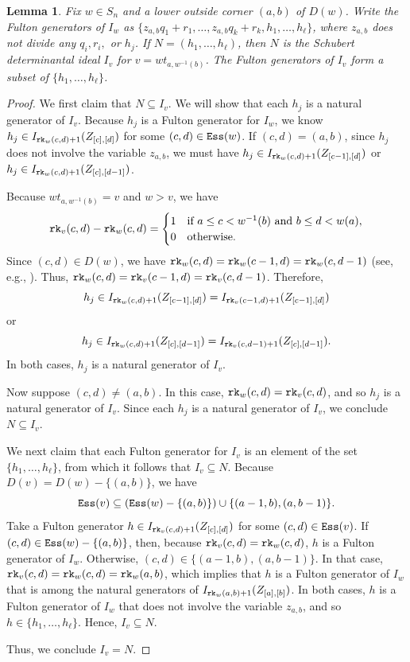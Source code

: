 \documentclass[12pt,reqno]{amsart}
\newtheorem{lemma}[theorem]{Lemma}
\newtheorem{Main Conjecture}[theorem]{Main Conjecture}
\theoremstyle{remark}
\theoremstyle{plain}
\newcommand{\ess}{{\tt Ess}}
\newcommand{\rk}{{\tt rk}}
\begin{document}
\begin{lemma}\label{lem:NisSchub}
Fix $w \in S_n$ and a lower outside corner $(a,b)$ of $D(w)$.
 Write the Fulton generators of $I_w$ as $\{z_{a,b}q_1+r_1, \ldots, z_{a,b}q_k+r_k, h_1, \ldots, h_\ell\}$, where $z_{a,b}$ does not divide any $q_i, r_i,$ or $h_j$.  If $N=(h_1, \ldots, h_\ell)$, then $N$ is the Schubert determinantal ideal $I_v$ for $v=wt_{a,w^{-1}(b)}$.  
 The Fulton generators  of $I_v$ form a subset  of $\{h_1,\ldots,h_\ell\}$.
\end{lemma}
\begin{proof}
\noindent We first claim that  $N\subseteq I_v$.  We will show that each $h_j$ is a natural generator of $I_v$.
Because $h_j$ is a Fulton generator for $I_w$, we know $h_j\in I_{\rk_w(c,d)+1}(Z_{[c],[d]})$ for some $(c,d)\in \ess(w)$.  If $(c,d)=(a,b)$, since $h_j$ does not involve the variable $z_{a,b}$, we must have $h_j\in I_{\rk_w(c,d)+1}(Z_{[c-1],[d]})$ or $h_j\in I_{\rk_w(c,d)+1}(Z_{[c],[d-1]})$.  


Because $wt_{a,w^{-1}(b)}=v$ and $w>v$, we have \[\rk_v(c,d)-\rk_{w}(c,d)=
\begin{cases}
1& \text{if } a\leq c<w^{-1}(b) \text{ and } b\leq d <w(a), \\
0& \text{otherwise.}
\end{cases}
\]  Since $(c,d)\in D(w)$, we have $\rk_w(c,d)=\rk_w(c-1,d)=\rk_w(c,d-1)$ (see, e.g., \cite[Lemmas 3.3 and 3.5]{Wei21}).  Thus, $\rk_w(c,d)=\rk_v(c-1,d)=\rk_v(c,d-1)$.  
Therefore, 
\[h_j\in I_{\rk_w(c,d)+1}(Z_{[c-1],[d]})=I_{\rk_v(c-1,d)+1}(Z_{[c-1],[d]})\]
or
\[h_j\in I_{\rk_w(c,d)+1}(Z_{[c],[d-1]})=I_{\rk_v(c,d-1)+1}(Z_{[c],[d-1]}).\]
In both cases, $h_j$ is a natural generator of $I_v$.  


Now suppose $(c,d)\neq (a,b)$.  In this case, $\rk_w(c,d)=\rk_v(c,d)$, and so $h_j$ is a natural generator of $I_v$.  Since each $h_j$ is a natural generator of $I_v$, we conclude $N\subseteq I_v$.

We next claim that each Fulton generator for $I_v$ is an element of the set $\{h_1,\ldots, h_\ell\}$, from which it follows that $I_v\subseteq N$.  Because $D(v)=D(w)-\{(a,b)\}$, we have 
\[\ess(v)\subseteq (\ess(w)-\{(a,b)\})\cup \{(a-1,b),(a,b-1)\}.\]  Take a Fulton generator $h\in I_{\rk_v(c,d)+1}(Z_{[c],[d]})$ for some $(c,d) \in \ess(v)$.
If $(c,d)\in \ess(w)-\{(a,b)\}$, then, because $\rk_v(c,d)=\rk_w(c,d)$, $h$ is a Fulton generator of $I_w$.  
Otherwise, $(c,d)\in \{(a-1,b),(a,b-1)\}$.  In that case, $\rk_v(c,d)=\rk_w(c,d) = \rk_w(a,b)$, which implies that $h$ is a Fulton generator of $I_w$ that is among the natural generators of $I_{\rk_w(a,b)+1}(Z_{[a],[b]})$.  In both cases, $h$ is a Fulton generator of $I_w$ that does not involve the variable $z_{a,b}$, and so $h\in \{h_1,\ldots, h_\ell\}$.  Hence, $I_v\subseteq N$.

Thus, we conclude $I_v=N$.
\end{proof}
\end{document}
